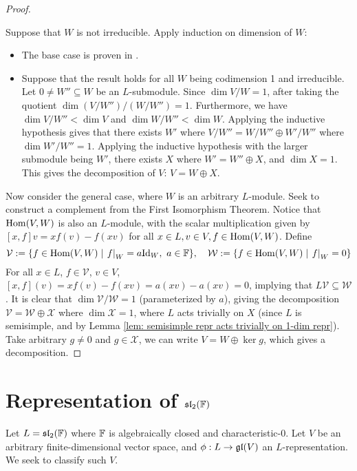 \documentclass{article}
\begin{document}
\begin{proof}
\begin{addmargin}{2em}
         Suppose that $W$ is not irreducible. Apply induction on dimension of $W$:
        \begin{itemize}
            \item The base case is proven in .
            \item Suppose that the result holds for all $W$ being codimension 1 and irreducible. Let $0 \neq W'' \subseteq W$ be an $L$-submodule. Since $\dim V/W = 1$, after taking the quotient $\dim (V/W'')/(W/W'') = 1$. Furthermore, we have $\dim V/W'' < \dim V$ and $\dim W/W'' < \dim W$. Applying the inductive hypothesis gives that there exists $W'$ where $V/W'' = W/W'' \oplus W'/W''$ where $\dim W'/W'' = 1$. Applying the inductive hypothesis with the larger submodule being $W'$, there exists $X$ where $W' = W'' \oplus X$, and $\dim X = 1$. This gives the decomposition of $V$: $V = W \oplus X$.
        \end{itemize}
    \end{addmargin}
     Now consider the general case, where $W$ is an arbitrary $L$-module. Seek to construct a complement from the First Isomorphism Theorem. Notice that $\mathrm{Hom}(V, W)$ is also an $L$-module, with the scalar multiplication given by $[x, f]v = xf(v) - f(xv)$ for all $x \in L, v \in V, f \in \mathrm{Hom}(V, W)$. Define
    \[
        \mathcal{V} := \{ f \in \mathrm{Hom}(V, W) \mid \left.f\right|_{W} = a \mathrm{Id}_W, \ a \in \mathbb{F} \}, \quad \mathcal{W} := \{ f \in \mathrm{Hom}(V, W) \mid \left.f\right|_{W} = 0 \}
    \]
    For all $x \in L$, $f \in \mathcal{V}$, $v \in V$, $[x, f](v) = xf(v) - f(xv) = a(xv) - a(xv) = 0$, implying that $L\mathcal{V} \subseteq \mathcal{W}$. It is clear that $\dim \mathcal{V}/\mathcal{W} = 1$ (parameterized by $a$), giving the decomposition $\mathcal{V} = \mathcal{W} \oplus \mathcal{X}$ where $\dim \mathcal{X} = 1$, where $L$ acts trivially on $X$ (since $L$ is semisimple, and by Lemma \ref{lem: semisimple repr acts trivially on 1-dim repr}). Take arbitrary $g \neq 0$ and $g \in \mathcal{X}$, we can write $V = W \oplus \ker g$, which gives a decomposition.
\end{proof}

\section{Representation of $\mathfrak{sl}_2(\mathbb{F})$}

\textstart
Let $L = \mathfrak{sl}_2(\mathbb{F})$ where $\mathbb{F}$ is algebraically closed and characteristic-0. Let $V$ be an arbitrary finite-dimensional vector space, and $\phi: L \to \mathfrak{gl}(V)$ an $L$-representation. We seek to classify such $V$. 
\end{document}
